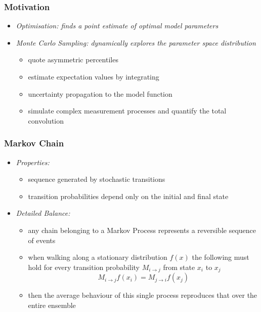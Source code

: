 	\begin{frame}
		\frametitle{Motivation}
		\begin{itemize}
			\item<2-> \itshape{Optimisation:} finds a point estimate of optimal model parameters
			\item<3-> \itshape{Monte Carlo Sampling:} dynamically explores the parameter space distribution
			\begin{itemize}
				\item<4-> quote asymmetric percentiles
				\item<5-> estimate expectation values by integrating
				\item<6-> uncertainty propagation to the model function
				\item<7-> simulate complex measurement processes and quantify the total convolution
			\end{itemize}
		\end{itemize}
	\end{frame}
	
	\begin{frame}
		\frametitle{Markov Chain}
		\begin{itemize}
			\item<2-> \itshape{Properties:}
			\begin{itemize}
				\item<3-> sequence generated by stochastic transitions
				\item<4-> transition probabilities depend only on the initial and final state
			\end{itemize}
			\item<5-> \itshape{Detailed Balance:}
			\begin{itemize}
				\item<6-> any chain belonging to a Markov Process represents a reversible sequence of events
				\item<7-> when walking along a stationary distribution $f(x)$ the following must hold for every
						  transition probability $M_{i \to j}$ from state $x_i$ to $x_j$
						  $$M_{i \to j} f(x_i) = M_{j \to i} f(x_j)$$
				\item<8-> then the average behaviour of this single process reproduces that over the entire ensemble
			\end{itemize}
		\end{itemize}
	\end{frame}
	
